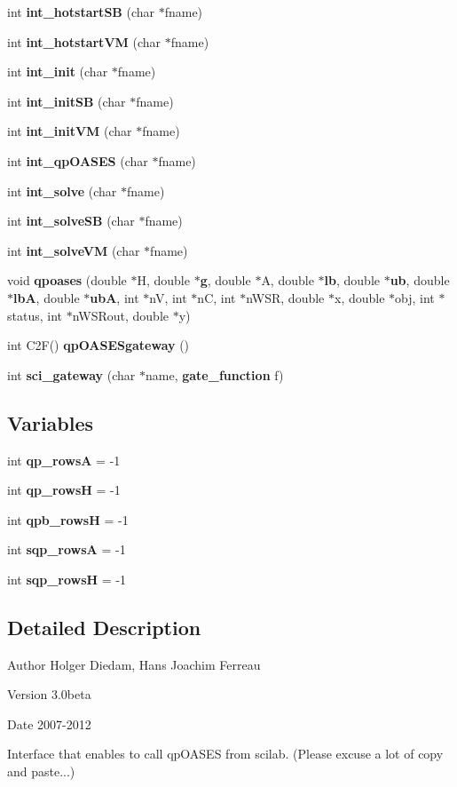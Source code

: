 \begin{DoxyCompactItemize}
\item 
int {\bf int\_\-hotstartSB} (char $\ast$fname)
\item 
int {\bf int\_\-hotstartVM} (char $\ast$fname)
\item 
int {\bf int\_\-init} (char $\ast$fname)
\item 
int {\bf int\_\-initSB} (char $\ast$fname)
\item 
int {\bf int\_\-initVM} (char $\ast$fname)
\item 
int {\bf int\_\-qpOASES} (char $\ast$fname)
\item 
int {\bf int\_\-solve} (char $\ast$fname)
\item 
int {\bf int\_\-solveSB} (char $\ast$fname)
\item 
int {\bf int\_\-solveVM} (char $\ast$fname)
\item 
void {\bf qpoases} (double $\ast$H, double $\ast${\bf g}, double $\ast$A, double $\ast${\bf lb}, double $\ast${\bf ub}, double $\ast${\bf lbA}, double $\ast${\bf ubA}, int $\ast$nV, int $\ast$nC, int $\ast$nWSR, double $\ast$x, double $\ast$obj, int $\ast$status, int $\ast$nWSRout, double $\ast$y)
\item 
int C2F() {\bf qpOASESgateway} ()
\item 
int {\bf sci\_\-gateway} (char $\ast$name, {\bf gate\_\-function} f)
\end{DoxyCompactItemize}
\subsection*{Variables}
\begin{DoxyCompactItemize}
\item 
int {\bf qp\_\-rowsA} = -\/1
\item 
int {\bf qp\_\-rowsH} = -\/1
\item 
int {\bf qpb\_\-rowsH} = -\/1
\item 
int {\bf sqp\_\-rowsA} = -\/1
\item 
int {\bf sqp\_\-rowsH} = -\/1
\end{DoxyCompactItemize}


\subsection{Detailed Description}
\begin{DoxyAuthor}{Author}
Holger Diedam, Hans Joachim Ferreau 
\end{DoxyAuthor}
\begin{DoxyVersion}{Version}
3.0beta 
\end{DoxyVersion}
\begin{DoxyDate}{Date}
2007-\/2012
\end{DoxyDate}
Interface that enables to call qpOASES from scilab. (Please excuse a lot of copy and paste...) 


